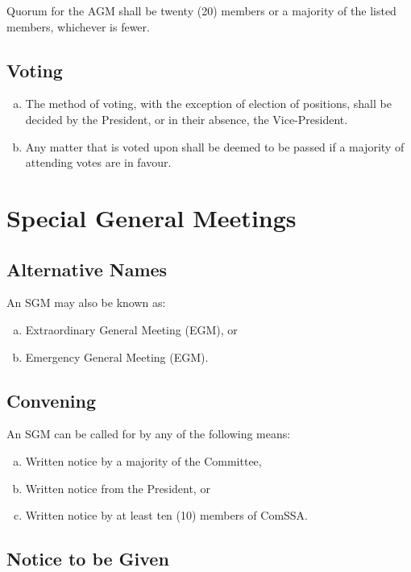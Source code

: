 \documentclass[a4paper,12pt]{article}
\begin{document}
Quorum for the AGM shall be twenty (20) members or a majority of the listed members, whichever is fewer.

\subsection{Voting}

\begin{enumerate}[a)]
	\item The method of voting, with the exception of election of positions, shall be decided by the President, or in their absence, the Vice-President.
	\item Any matter that is voted upon shall be deemed to be passed if a majority of attending votes are in favour.
\end{enumerate}

\section{Special General Meetings}

\subsection{Alternative Names}

An SGM may also be known as:

\begin{enumerate}[a)]
	\item Extraordinary General Meeting (EGM), or
	\item Emergency General Meeting (EGM).
\end{enumerate}

\subsection{Convening}

An SGM can be called for by any of the following means:

\begin{enumerate}[a)]
	\item Written notice by a majority of the Committee,
	\item Written notice from the President, or
	\item Written notice by at least ten (10) members of ComSSA.
\end{enumerate}

\subsection{Notice to be Given}
\end{document}
